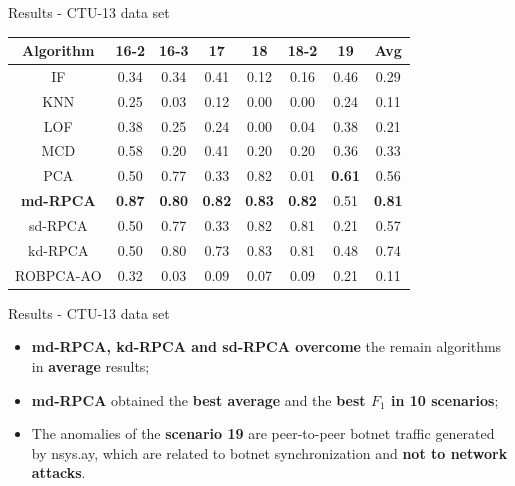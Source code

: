 \documentclass[newPxFont, numfooter, sectionpages]{beamer}
\begin{document}
\begin{frame}[c]{Results - CTU-13 data set}
        \begin{table}[h!]
      \centering
      \tiny
      \label{tab:4.05}
      \begin{tabular}{ c|c|c|c|c|c|c|c }
    	\toprule
            \textbf{Algorithm}	&\textbf{16-2}	&\textbf{16-3}	&\textbf{17}	&\textbf{18}	&\textbf{18-2}	&\textbf{19}	&\textbf{Avg} \\ \hline
            IF	&0.34	&0.34	&0.41	&0.12	&0.16	&0.46	&0.29\\ \hline
            KNN	&0.25	&0.03	&0.12	&0.00	&0.00	&0.24	&0.11\\ \hline
            LOF	&0.38	&0.25	&0.24	&0.00	&0.04	&0.38	&0.21\\ \hline
            MCD	&0.58	&0.20	&0.41	&0.20	&0.20	&0.36	&0.33\\ \hline
            PCA	&0.50	&0.77	&0.33	&0.82	&0.01	&\color{red}\textbf{0.61}	&0.56\\ \hline
            \color{red}\textbf{md-RPCA} &\color{red}\textbf{0.87}	&\color{red}\textbf{0.80}	&\color{red}\textbf{0.82}	&\color{red}\textbf{0.83}	&\color{red}\textbf{0.82}	&\color{blue}0.51	&\color{red}\textbf{0.81}\\ \hline
            sd-RPCA &0.50	&0.77	&0.33	&0.82	&0.81	&0.21	&0.57\\ \hline
            kd-RPCA &0.50	&0.80	&0.73	&0.83	&0.81	&0.48	&0.74\\ \hline
            ROBPCA-AO &0.32	&0.03	&0.09	&0.07	&0.09	&0.21	&0.11\\ \hline
        \bottomrule
      \end{tabular}
    \end{table}
\end{frame}

\begin{frame}[c]{Results - CTU-13 data set}
	\begin{itemize}
		\item \textbf{md-RPCA, kd-RPCA and sd-RPCA overcome} the remain algorithms in \textbf{average} results;
		\item \textbf{md-RPCA} obtained the \textbf{best average} and the \textbf{best $F_1$ in 10 scenarios};
		\item The anomalies of the \textbf{scenario 19} are peer-to-peer botnet traffic generated by nsys.ay, which are related to botnet synchronization and \textbf{not to network attacks}.
	\end{itemize}
\end{frame}
\end{document}
